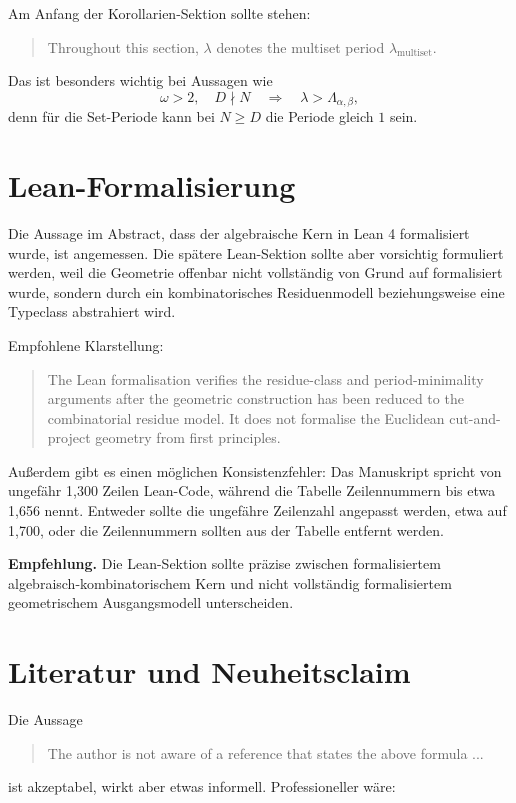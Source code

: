 \documentclass[11pt]{article}
\newcommand{\todo}[1]{\par\medskip\noindent\textbf{Empfehlung.} #1\par\medskip}
\begin{document}
Am Anfang der Korollarien-Sektion sollte stehen:

\begin{quote}
Throughout this section, \(\lambda\) denotes the multiset period \(\lambda_{\mathrm{multiset}}\).
\end{quote}

Das ist besonders wichtig bei Aussagen wie
\[
    \omega>2,\quad D\nmid N \quad\Longrightarrow\quad \lambda>\Lambda_{\alpha,\beta},
\]
denn für die Set-Periode kann bei \(N\ge D\) die Periode gleich \(1\) sein.

\section{Lean-Formalisierung}

Die Aussage im Abstract, dass der algebraische Kern in Lean 4 formalisiert wurde, ist angemessen. Die spätere Lean-Sektion sollte aber vorsichtig formuliert werden, weil die Geometrie offenbar nicht vollständig von Grund auf formalisiert wurde, sondern durch ein kombinatorisches Residuenmodell beziehungsweise eine Typeclass abstrahiert wird.

Empfohlene Klarstellung:

\begin{quote}
The Lean formalisation verifies the residue-class and period-minimality arguments after the geometric construction has been reduced to the combinatorial residue model. It does not formalise the Euclidean cut-and-project geometry from first principles.
\end{quote}

Außerdem gibt es einen möglichen Konsistenzfehler: Das Manuskript spricht von ungefähr 1,300 Zeilen Lean-Code, während die Tabelle Zeilennummern bis etwa 1,656 nennt. Entweder sollte die ungefähre Zeilenzahl angepasst werden, etwa auf 1,700, oder die Zeilennummern sollten aus der Tabelle entfernt werden.

\todo{Die Lean-Sektion sollte präzise zwischen formalisiertem algebraisch-kombinatorischem Kern und nicht vollständig formalisiertem geometrischem Ausgangsmodell unterscheiden.}

\section{Literatur und Neuheitsclaim}

Die Aussage
\begin{quote}
The author is not aware of a reference that states the above formula ...
\end{quote}
ist akzeptabel, wirkt aber etwas informell. Professioneller wäre:
\end{document}

